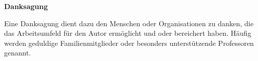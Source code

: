 \begin{center}
\textsf{\textbf{\large Danksagung}}
\end{center}

\noindent Eine Danksagung dient dazu den Menschen oder Organisationen zu danken, die das Arbeitsumfeld für den Autor ermöglicht und oder bereichert haben. Häufig werden geduldige Familienmitglieder oder besonders unterstützende Professoren genannt.